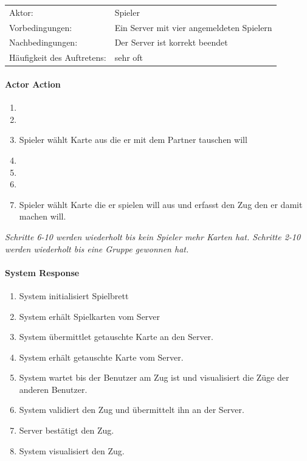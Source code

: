 \documentclass[a4paper,12pt,halfparskip,DIV14]{scrartcl}
\begin{document}
\begin{tabular}{@{} l l @{}}
	Aktor:       											&	Spieler \\
	Vorbedingungen:										& Ein Server mit vier angemeldeten Spielern \\
	Nachbedingungen:									& Der Server ist korrekt beendet \\
	Häufigkeit des Auftretens:				& sehr oft \\
\end{tabular}
\newpage
\begin{multicols}{2}
\raggedcolumns
\paragraph{Actor Action}
\begin{enumerate}
	\item[]
	\item[]
	\item[3] Spieler wählt Karte aus die er mit dem Partner tauschen will
	\item[]
	\item[]
	\item[]
	\item[7] Spieler wählt Karte die er spielen will aus und erfasst den Zug den er damit machen will.
\end{enumerate}
\emph{Schritte 6-10 werden wiederholt bis kein Spieler mehr Karten hat.\newline
Schritte 2-10 werden wiederholt bis eine Gruppe gewonnen hat.}
\columnbreak
\paragraph{System Response}
\begin{enumerate}
	\item[1] System initialisiert Spielbrett
	\item[2] System erhält Spielkarten vom Server
	\item[4] System übermittlet getauschte Karte an den Server.
	\item[5] System erhält getauschte Karte vom Server.
	\item[6] System wartet bis der Benutzer am Zug ist und visualisiert die Züge der anderen Benutzer.
	\item[8] System validiert den Zug und übermittelt ihn an der Server.
  \item[9] Server bestätigt den Zug.
  \item[10] System visualisiert den Zug.
\end{enumerate}
\end{multicols}
\end{document}
